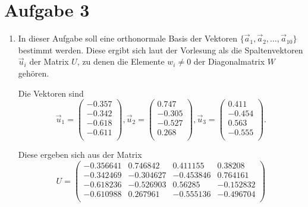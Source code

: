 \section*{Aufgabe 3}

\begin{enumerate}[label=\alph*)]
    \item In dieser Aufgabe soll eine orthonormale Basis der Vektoren $\{\vec a_1, \vec a_2, \dots, \vec a_{10}\}$ bestimmt werden.
    Diese ergibt sich laut der Vorlesung als die Spaltenvektoren $\vec u_i$ der Matrix $U$, zu denen die Elemente $w_i \neq 0$ der Diagonalmatrix $W$ gehören. 

    Die Vektoren sind 
    \begin{equation*}
        \vec u_1 = 
        \begin{pmatrix*}
        -0.357\\
        -0.342\\
        -0.618\\
        -0.611\\
        \end{pmatrix*},
        \vec u_2 = 
        \begin{pmatrix*}
         0.747\\
        -0.305\\
        -0.527\\
         0.268\\
        \end{pmatrix*},
        \vec u_3 = 
        \begin{pmatrix*}
         0.411\\
        -0.454\\
         0.563\\
        -0.555\\
        \end{pmatrix*}.
    \end{equation*}

    Diese ergeben sich aus der Matrix
    \begin{equation*}
       U = \begin{pmatrix*}
-0.356641&	0.746842 &	0.411155 &	0.38208 \\
-0.342469&  -0.304627 &	-0.453846 &	0.764161 \\
-0.618236&	-0.526903 &	0.56285 &	-0.152832 \\
-0.610988&	0.267961 &	-0.555136 &	-0.496704 \\
        \end{pmatrix*}
    \end{equation*}


\end{enumerate}
